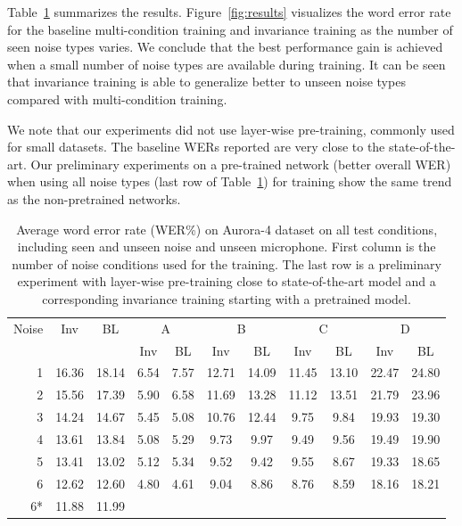 \documentclass{article}
\begin{document}
Table~\ref{tab:results} summarizes the results. Figure~\ref{fig:results} visualizes the word error rate for the baseline multi-condition training and invariance training as the number of seen noise types varies. We conclude that the best performance
gain is achieved when a small number of noise types are available during training. It can be seen that invariance training is able to generalize better to unseen noise types compared with multi-condition training.

We note that our experiments did not use layer-wise pre-training, commonly used for small
datasets. The baseline WERs reported are very close to the state-of-the-art. %
Our preliminary experiments on a pre-trained network (better overall WER) when using all noise types (last row of Table~\ref{tab:results}) for training show the same trend as the non-pretrained networks.

\begin{table}
    \centering
    \caption{Average word error rate (WER\%) on Aurora-4 dataset on all test conditions,
        including seen and unseen noise and unseen microphone. First column
        is the number of noise conditions used for the training. The last row is a 
        preliminary experiment with layer-wise pre-training close to state-of-the-art
        model and a corresponding invariance training starting with a pretrained model.}
    \label{tab:results}
    \begin{tabular}{r|cc||cc|cc|cc|cc}
        Noise       &Inv&BL&  \multicolumn{2}{c|}{A} & \multicolumn{2}{c|}{B} & \multicolumn{2}{c|}{C} & \multicolumn{2}{c}{D}\\
               & & &  Inv & BL & Inv & BL & Inv & BL & Inv & BL\\
    \hline
    1           &16.36        &18.14 &6.54&7.57    &12.71& 14.09   & 11.45&   13.10    & 22.47 &   24.80    \\
    2           &15.56        &17.39 &5.90&  6.58 &   11.69   &13.28   &11.12   &13.51   &21.79   &23.96 \\
    3           &14.24        &14.67 &5.45 & 5.08&    10.76&   12.44&   9.75&    9.84 &   19.93&   19.30\\
    4           &13.61        &13.84 & 5.08 &5.29    &9.73    &9.97    &9.49    &9.56    &19.49   &19.90\\         
    5           &13.41        &13.02 & 5.12 &5.34    &9.52    &9.42    &9.55    &8.67    &19.33   &18.65\\         
    6           &12.62        &12.60 & 4.80 &4.61    &9.04    &8.86    &8.76    &8.59    &18.16   &18.21\\
    \hline\hline
    6* &11.88        &11.99
    \end{tabular}
\end{table}
\end{document}
